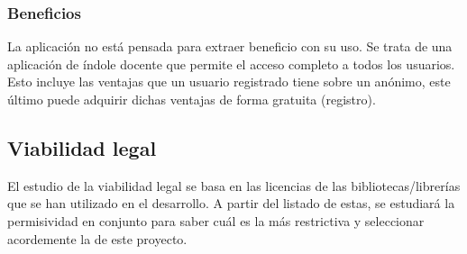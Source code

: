 \subsubsection{Beneficios}

La aplicación no está pensada para extraer beneficio con su uso. Se trata de una
aplicación de índole docente que permite el acceso completo a todos los
usuarios. Esto incluye las ventajas que un usuario registrado tiene sobre un
anónimo, este último puede adquirir dichas ventajas de forma gratuita
(registro).

\clearpage
\subsection{Viabilidad legal}

El estudio de la viabilidad legal se basa en las licencias de las
bibliotecas/librerías que se han utilizado en el desarrollo. A partir del
listado de estas, se estudiará la permisividad en conjunto para saber cuál es la
más restrictiva y seleccionar acordemente la de este proyecto.

